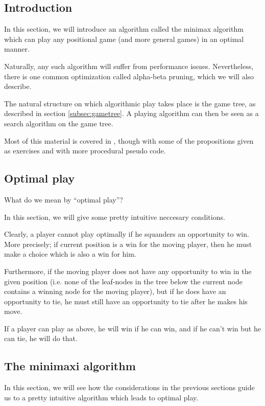 \subsection{Introduction}

In this section, we will introduce an algorithm called the minimax algorithm which can play any positional game (and more general games) in an optimal manner.

Naturally, any such algorithm will suffer from performance issues.
Nevertheless, there is one common optimization called alpha-beta pruning, which we will also describe.

The natural structure on which algorithmic play takes place is the game tree, as described in section \ref{subsec:gametree}.
A playing algorithm can then be seen as a search algorithm on the game tree.


Most of this material is covered in \citep{aimodernapproach}, though with some of the propositions given as exercises and with more procedural pseudo code.

\subsection{Optimal play}

What do we mean by ``optimal play''?

In this section, we will give some pretty intuitive neccesary conditions.

Clearly, a player cannot play optimally if he squanders an opportunity to win.
More precisely; if current position is a win for the moving player, then he must make a choice which is also a win for him.

Furthermore, if the moving player does not have any opportunity to win in the given position (i.e. none of the leaf-nodes in the tree below the current node contains a winning node for the moving player), but if he does have an opportunity to tie, he must still have an opportunity to tie after he makes his move.

If a player can play as above, he will win if he can win, and if he can't win but he can tie, he will do that.

\subsection{The minimaxi algorithm}
\label{sec:minimaxi}

In this section, we will see how the considerations in the previous sections guide us to a pretty intuitive algorithm which leads to optimal play.

